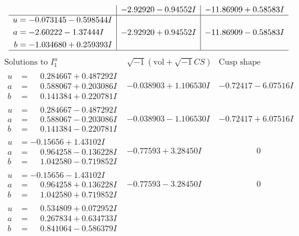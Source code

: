 \documentclass[1p]{elsarticle_modified}
\theoremstyle{definition}
\newcommand{\I}{\sqrt{-1}}
\begin{document}
$$\begin{array}{c|c|c}
 & -2.92920 - 0.94552 I & -11.86909 + 0.58583 I \\ \hline\begin{aligned}
u &= -0.073145 - 0.598544 I \\
a &= -2.60222 - 1.37444 I \\
b &= -1.034680 + 0.259393 I\end{aligned}
 & -2.92920 + 0.94552 I & -11.86909 - 0.58583 I\\
 \hline 
 \end{array}$$\newpage$$\begin{array}{c|c|c}  
\text{Solutions to }I^u_{1}& \I (\text{vol} + \sqrt{-1}CS) & \text{Cusp shape}\\
 \hline 
\begin{aligned}
u &= \phantom{-}0.284667 + 0.487292 I \\
a &= \phantom{-}0.588067 + 0.203086 I \\
b &= \phantom{-}0.141384 + 0.220781 I\end{aligned}
 & -0.038903 + 1.106530 I & -0.72417 - 6.07516 I \\ \hline\begin{aligned}
u &= \phantom{-}0.284667 - 0.487292 I \\
a &= \phantom{-}0.588067 - 0.203086 I \\
b &= \phantom{-}0.141384 - 0.220781 I\end{aligned}
 & -0.038903 - 1.106530 I & -0.72417 + 6.07516 I \\ \hline\begin{aligned}
u &= -0.15656 + 1.43102 I \\
a &= \phantom{-}0.964258 - 0.136228 I \\
b &= \phantom{-}1.042580 - 0.719852 I\end{aligned}
 & -0.77593 + 3.28450 I & \phantom{-0.000000 } 0 \\ \hline\begin{aligned}
u &= -0.15656 - 1.43102 I \\
a &= \phantom{-}0.964258 + 0.136228 I \\
b &= \phantom{-}1.042580 + 0.719852 I\end{aligned}
 & -0.77593 - 3.28450 I & \phantom{-0.000000 } 0 \\ \hline\begin{aligned}
u &= \phantom{-}0.534809 + 0.072952 I \\
a &= \phantom{-}0.267834 + 0.634733 I \\
b &= \phantom{-}0.841064 - 0.586379 I\end{aligned}

\end{array}$$
\end{document}
